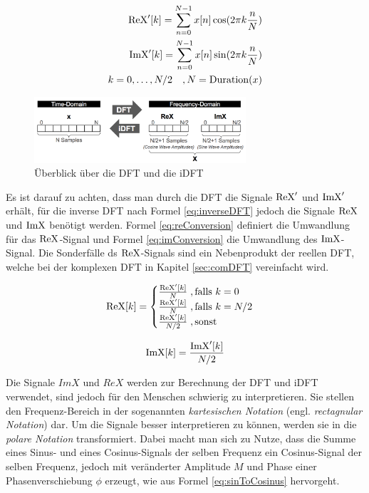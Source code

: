 \begin{equation}
\begin{split}
\operatorname{ReX}'[k] = \sum_{n=0}^{N-1}x[n] \cos(2\pi k \frac{n}{N}) \\
\operatorname{ImX}'[k] = \sum_{n=0}^{N-1}x[n] \sin(2\pi k \frac{n}{N}) \\
k = 0, \ldots , N/2 \quad , N = \text{Duration}(x)
\end{split}
\label{eq:forwardDFT}
\end{equation}

\begin{figure}[h]
	\centering
	\includegraphics[width=0.7\textwidth]{bilder/timeToFrequency_self.png}
	\caption{Überblick über die DFT und die iDFT}
	\label{img:timToFreq}
\end{figure}

Es ist darauf zu achten, dass man durch die DFT die Signale $\operatorname{ReX}'$ und $\operatorname{ImX}'$ erhält, für die inverse DFT nach Formel \ref{eq:inverseDFT}  jedoch die Signale  $\operatorname{ReX}$ und $\operatorname{ImX}$ benötigt werden. Formel \ref{eq:reConversion} definiert die Umwandlung für das $\operatorname{ReX}$-Signal und Formel \ref{eq:imConversion} die Umwandlung des $\operatorname{ImX}$-Signal. Die Sonderfälle ds $\operatorname{ReX}$-Signals sind ein Nebenprodukt der reellen DFT, welche bei der komplexen DFT in Kapitel \ref{sec:comDFT} vereinfacht wird.

\begin{equation}
\operatorname{ReX}[k] = 
\begin{cases}
\frac{\operatorname{ReX}'[k]}{N} \; , \text{falls } k = 0 \\
\frac{\operatorname{ReX}'[k]}{N} \; , \text{falls } k = N/2 \\
\frac{\operatorname{ReX}'[k]}{N/2} \; ,\text{sonst} \\
\end{cases}
\label{eq:reConversion}
\end{equation}

\begin{equation}
\operatorname{ImX}[k] = \frac{\operatorname{ImX}'[k]}{N/2}
\label{eq:imConversion}
\end{equation}

Die Signale $ImX$ und $ReX$ werden zur Berechnung der DFT und iDFT verwendet, sind jedoch für den Menschen schwierig zu interpretieren. Sie stellen den Frequenz-Bereich in der sogenannten \emph{kartesischen Notation} (engl. \emph{rectagnular Notation}) dar. Um die Signale besser interpretieren zu können, werden sie in die \emph{polare Notation} transformiert. Dabei macht man sich zu Nutze, dass die Summe eines Sinus- und eines Cosinus-Signals der selben Frequenz ein Cosinus-Signal der selben Frequenz, jedoch mit veränderter Amplitude $M$ und Phase einer Phasenverschiebung $\phi$ erzeugt, wie aus Formel \ref{eq:sinToCosinus} hervorgeht.

